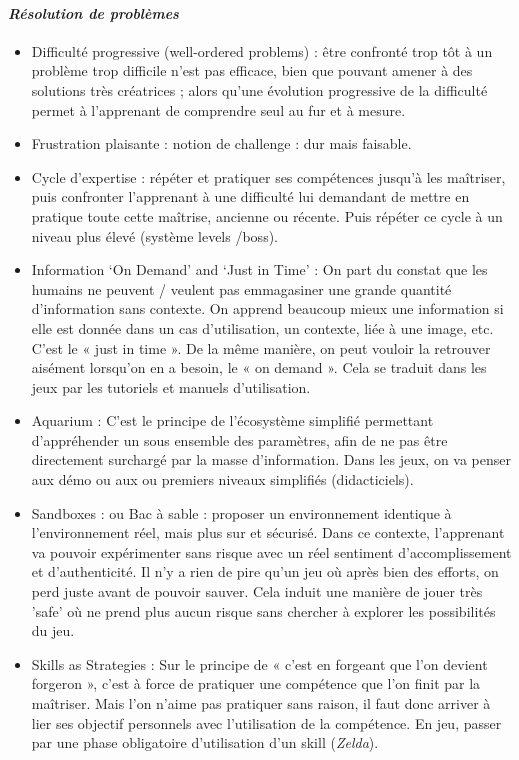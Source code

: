 			\paragraph{\emph{Résolution de problèmes}}
			\begin{itemize}
				\item {Difficulté progressive (well-ordered problems)} : être confronté trop tôt à un problème
trop difficile n'est pas efficace, bien que pouvant amener à des solutions très créatrices ;
alors qu'une évolution progressive de la difficulté permet à l'apprenant de comprendre seul au fur et à mesure.
				\item {Frustration plaisante} : notion de challenge : dur mais faisable.
				\item {Cycle d'expertise} : répéter et pratiquer ses compétences jusqu'à les maîtriser, puis
confronter l'apprenant à une difficulté lui demandant de mettre en pratique toute cette maîtrise, ancienne ou récente. Puis répéter ce cycle à un niveau plus élevé (système levels /boss).
				\item {Information ‘On Demand’ and ‘Just in Time’} :
On part du constat que les humains ne peuvent / veulent pas emmagasiner une grande quantité d'information sans contexte. On apprend beaucoup mieux une information si elle est donnée dans un cas d'utilisation, un contexte, liée à une image, etc. C'est le « just in time ». De la même manière, on peut vouloir la retrouver aisément lorsqu'on en a besoin, le « on demand ». Cela se traduit dans les jeux par les tutoriels et manuels d'utilisation.
				\item {Aquarium} : C'est le principe de l'écosystème simplifié permettant d'appréhender un sous ensemble des paramètres, afin de ne pas être directement surchargé par la masse d'information. Dans les jeux, on va penser aux démo ou aux ou premiers niveaux simplifiés (didacticiels).
				\item {Sandboxes : ou Bac à sable} : proposer un environnement identique à l'environnement réel, mais plus sur et sécurisé. Dans ce contexte, l'apprenant va pouvoir expérimenter sans risque avec un réel sentiment d'accomplissement et d'authenticité. Il n'y a rien de pire qu'un jeu où après bien des efforts, on perd juste avant de pouvoir sauver. Cela induit une manière de jouer très 'safe' où ne prend plus aucun risque sans chercher à explorer les possibilités du jeu.
				\item {Skills as Strategies} : Sur le principe de « c'est en forgeant que l'on devient forgeron », c'est à force de pratiquer une compétence que l'on finit par la maîtriser. Mais l'on n'aime pas pratiquer sans raison, il faut donc arriver à lier ses objectif personnels avec l'utilisation de la compétence. En jeu, passer par une phase obligatoire d'utilisation d'un skill (\emph{Zelda}).
		\end{itemize}
